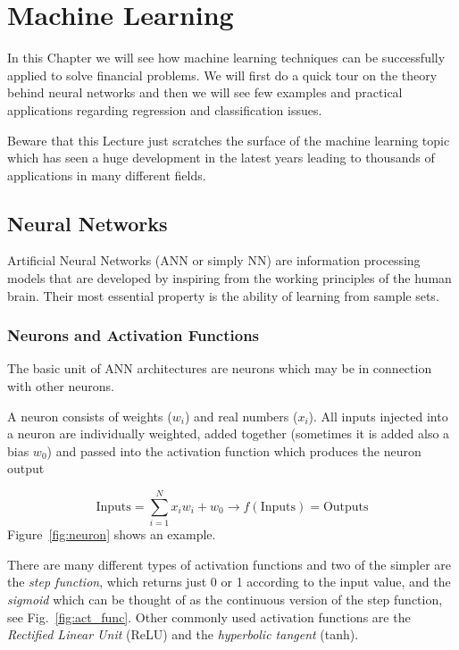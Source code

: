 \chapter{Machine Learning}
\label{ch:neural-network}

In this Chapter we will see how machine learning techniques can be successfully applied to solve financial problems. We will first do a quick tour on the theory behind neural networks and then we will see few examples and practical applications regarding regression and classification issues.

Beware that this Lecture just scratches the surface of the machine learning topic which has seen a huge development in the latest years leading to thousands of applications in many different fields.
    
\section{Neural Networks}\label{neural-networks}

Artificial Neural Networks (ANN or simply NN) are information processing models that are developed by inspiring from the working principles of the human brain. Their most essential property is the ability of learning from sample sets.

\subsection{Neurons and Activation Functions}
The basic unit of ANN architectures are neurons which may be in connection with other neurons.

A neuron consists of weights (\(w_i\)) and real numbers (\(x_i\)). All inputs injected into a neuron are individually weighted, added together (sometimes it is added also a bias \(w_0\)) and passed into the activation function which produces the neuron output

\[ \textrm{Inputs} = \sum_{i=1}^{N} x_i w_i +w_0 \rightarrow f(\textrm{Inputs}) = \textrm{Outputs}\]
Figure~\ref{fig:neuron} shows an example.

There are many different types of activation functions and two of the simpler are the \emph{step function}, which returns just 0 or 1 according to the input value, and the \emph{sigmoid} which can be thought of as the continuous version of the step function, see Fig.~\ref{fig:act_func}.
Other commonly used activation functions are the \emph{Rectified Linear Unit} (ReLU) and the \emph{hyperbolic tangent} (tanh).

